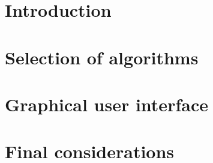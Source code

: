 

\chapter{Introduction}

\chapter{Selection of algorithms}

\chapter{Graphical user interface}
\chapter{Final considerations}